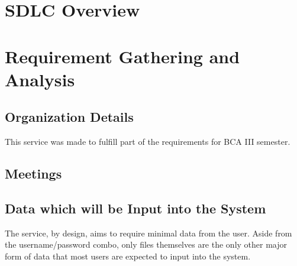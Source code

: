 \documentclass[12pt,a4paper]{report}
\begin{document}
\chapter{SDLC Overview}\label{cha:sdlc_overview}
\newpage
\chapter{Requirement Gathering and Analysis}\label{sec:requirement_gathering_and_analysis}
\section{Organization Details}\label{sec:organization_details}

This service was made to fulfill part of the requirements for BCA III semester.

\section{Meetings}\label{sec:meetings}
\section{Data which will be Input into the System}\label{sec:data_which_will_be_input_into_system}
The service, by design, aims to require minimal data from the user. Aside from the username/password combo, only files themselves are the only other major form of data that most users are expected to input into the system.
\end{document}
